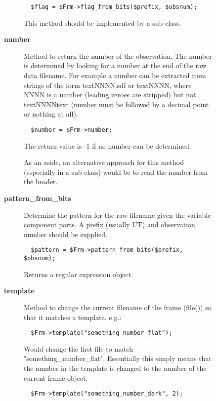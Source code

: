\begin{description}
\begin{description}
\begin{description}
\begin{verbatim}
  $flag = $Frm->flag_from_bits($prefix, $obsnum);
\end{verbatim}


This method should be implemented by a sub-class.


\item[{\textbf{number}}] \mbox{}

Method to return the number of the observation. The number is
determined by looking for a number at the end of the raw data
filename.  For example a number can be extracted from strings of the
form textNNNN.sdf or textNNNN, where NNNN is a number (leading zeroes
are stripped) but not textNNNNtext (number must be followed by a decimal
point or nothing at all).

\begin{verbatim}
  $number = $Frm->number;
\end{verbatim}


The return value is -1 if no number can be determined.



As an aside, an alternative approach for this method (especially
in a sub-class) would be to read the number from the header.


\item[{\textbf{pattern\_from\_bits}}] \mbox{}

Determine the pattern for the raw filename given the variable component
parts. A prefix (usually UT) and observation number should
be supplied.

\begin{verbatim}
  $pattern = $Frm->pattern_from_bits($prefix, $obsnum);
\end{verbatim}


Returns a regular expression object.


\item[{\textbf{template}}] \mbox{}

Method to change the current filename of the frame (file())
so that it matches a template. e.g.:

\begin{verbatim}
  $Frm->template("something_number_flat");
\end{verbatim}


Would change the first file to match "something\_number\_flat".
Essentially this simply means that the number in the template
is changed to the number of the current frame object.

\begin{verbatim}
  $Frm->template("something_number_dark", 2);
\end{verbatim}



\end{description}
\end{description}
\end{description}
